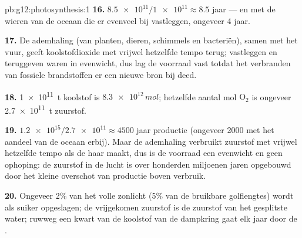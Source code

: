 \begin{solution}{pb:g12:photosynthesis:1}
\textbf{16.} $\num{8.5e11}/\num{1e11} \approx 8.5$ jaar --- en met de
wieren van de oceaan die er evenveel bij vastleggen, ongeveer 4 jaar.

\textbf{17.} De ademhaling (van planten, dieren, schimmels en bacteriën),
samen met het vuur, geeft koolstofdioxide met vrijwel hetzelfde tempo
terug; vastleggen en teruggeven waren in evenwicht, dus lag de voorraad
vast totdat het verbranden van fossiele brandstoffen er een nieuwe bron
bij deed.

\textbf{18.} \qty{1e11}{t} koolstof is $\num{8.3e12}\,\unit{mol}$;
hetzelfde aantal mol $\mathrm{O_2}$ is ongeveer \qty{2.7e11}{t} zuurstof.

\textbf{19.} $\num{1.2e15}/\num{2.7e11} \approx 4500$ jaar productie
(ongeveer 2000 met het aandeel van de oceaan erbij). Maar de ademhaling
verbruikt zuurstof met vrijwel hetzelfde tempo als de  haar
maakt, dus is de voorraad een evenwicht en geen ophoping: de zuurstof in
de lucht is over honderden miljoenen jaren opgebouwd door het kleine
overschot van productie boven verbruik.

\textbf{20.} Ongeveer 2\% van het volle zonlicht (5\% van de bruikbare
golflengtes) wordt als suiker opgeslagen; de vrijgekomen zuurstof is de
zuurstof van het gesplitste water; ruwweg een kwart van de koolstof van de
dampkring gaat elk jaar door de .
\end{solution}
